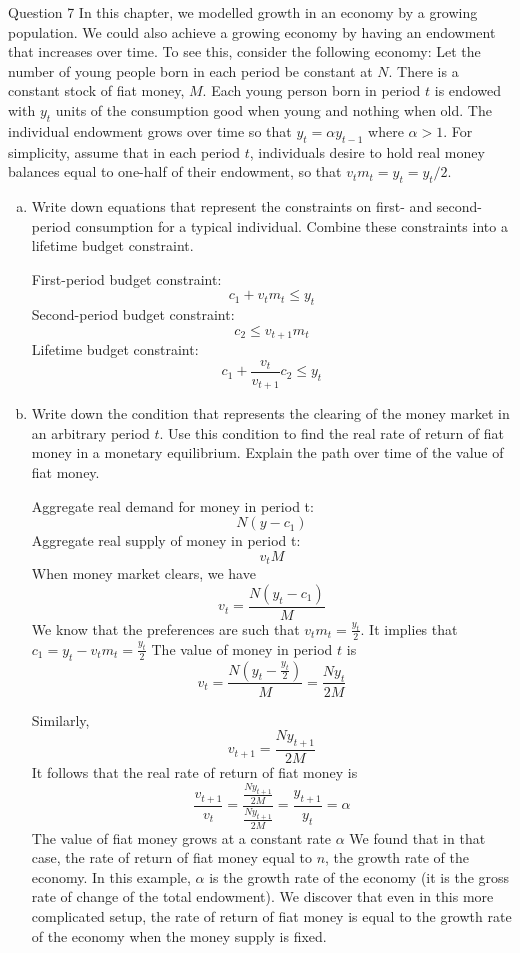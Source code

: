 \documentclass[a4paper]{article}
\newif\IfInSansMode
\numberwithin{equation}{section}
\numberwithin{figure}{section}
\begin{document}
	\begin{questionbox}{Question 7}
		In this chapter, we modelled growth in an economy by a growing population. We could also achieve a growing economy by having an endowment that increases over time. To see this, consider the following economy: Let the number of young people born in each period be constant at \( N \). There is a constant stock of fiat money, \( M \). Each young person born in period \( t \) is endowed with \( y_t \) units of the consumption good when young and nothing when old. The individual endowment grows over time so that \( y_t = \alpha y_{t-1} \) where \( \alpha > 1 \). For simplicity, assume that in each period \( t \), individuals desire to hold real money balances equal to one-half of their endowment, so that \( v_tm_t = y_t= y_t/2 \).
		\begin{enumerate}[(a)]
			\item Write down equations that represent the constraints on first- and second-period consumption for a typical individual. Combine these constraints into a lifetime budget constraint.
			\begin{explanationbox}
				First-period budget constraint:
				\[
					c_1 + v_tm_t \leq y_t
				\]
				Second-period budget constraint:
				\[
					c_2 \leq v_{t+1}m_t
				\]
				Lifetime budget constraint:
				\[
					c_1+\frac{v_t}{v_{t+1}}c_2\leq y_t
				\]
			\end{explanationbox}
			\item Write down the condition that represents the clearing of the money market in an arbitrary period \( t \). Use this condition to find the real rate of return of fiat money in a monetary equilibrium. Explain the path over time of the value of fiat money.
			\begin{explanationbox}
				Aggregate real demand for money in period t:
				\[
					N (y-c_1)
				\]
				Aggregate real supply of money in period t:
				\[
					v_tM
				\]
				When money market clears, we have
				\[
					v_t=\frac{N(y_t-c_1)}{M}
				\]
				We know that the preferences are such that \( v_tm_t=\frac{y_t}{2} \). It implies that \( c_1=y_t-v_tm_t =\frac{y_t}{2}\) The value of money in period \(t\) is
				\[
					v_t=\frac{N\left(y_t-\frac{y_t}{2}\right)}{M} = \frac{Ny_t}{2M}
				\]
			\end{explanationbox}
			\begin{explanationbox}
				Similarly,
				\[
					v_{t+1} = \frac{Ny_{t+1}}{2M}
				\]
				It follows that the real rate of return of fiat money is
				\[
					\frac{v_{t+1}}{v_t} = \frac{\frac{Ny_{t+1}}{2M}}{\frac{Ny_{t+1}}{2M}} = \frac{y_{t+1}}{y_t} = \alpha
				\]
				The value of fiat money grows at a constant rate \( \alpha \) We found that in that case, the rate of return of fiat money equal to \( n \), the growth rate of the economy. In this example, \( \alpha \) is the growth rate of the economy (it is the gross rate of change of the total endowment). We discover that even in this more complicated setup, the rate of return of fiat money is equal to the growth rate of the economy when the money supply is fixed.
			\end{explanationbox}
		\end{enumerate}
	\end{questionbox}
\end{document}
